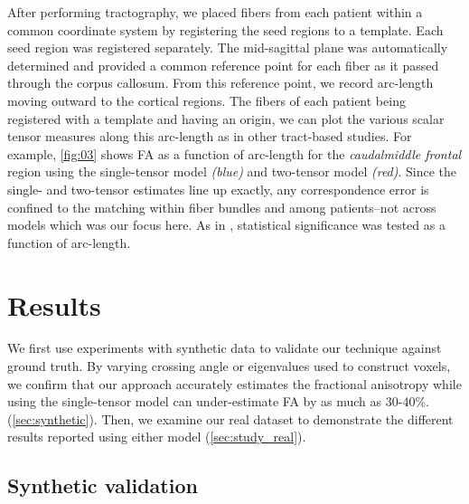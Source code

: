 \documentclass[final,hyperref]{gatech-thesis}
\newcommand{\region}[1]{\textit{#1}\xspace}
\newcommand{\green}{\region{caudalmiddle frontal}}
\begin{document}
After performing tractography, we placed fibers from each patient within a
common coordinate system by registering the seed regions to a template.  Each
seed region was registered separately.
%
The mid-sagittal plane was automatically determined and provided a common
reference point for each fiber as it passed through the corpus callosum.  From
this reference point, we record arc-length moving outward to the cortical
regions.  The fibers of each patient being registered with a template and
having an origin, we can plot the various scalar tensor measures along this
arc-length as in other tract-based studies.  For example, \autoref{fig:03}
shows FA as a function of arc-length for the \green region using the
single-tensor model \textit{(blue)} and two-tensor model \textit{(red)}.
Since the single- and two-tensor estimates line up exactly, any correspondence
error is confined to the matching within fiber bundles and among patients--not
across models which was our focus here.  As in \cite{ODonnell2007,Maddah2008},
statistical significance was tested as a function of arc-length.


\section{Results}

We first use experiments with synthetic data to validate our technique against
ground truth.
%
By varying crossing angle or eigenvalues used to construct voxels, we confirm
that our approach accurately estimates the fractional anisotropy while using
the single-tensor model can under-estimate FA by as much as 30-40\%.
(\autoref{sec:synthetic}).
%
Then, we examine our real dataset to demonstrate the different results
reported using either model (\autoref{sec:study_real}).


\subsection{Synthetic validation} \label{sec:synthetic}
\end{document}
